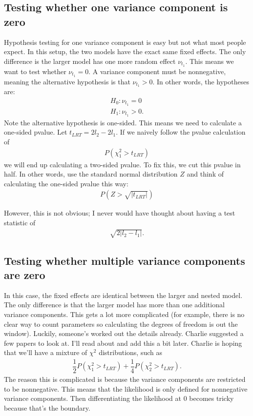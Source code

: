 \documentclass{article}
\begin{document}
 \subsection{Testing whether one variance component is zero}
  Hypothesis testing for one variance component is easy but not what most people expect.
  In this setup, the two models have the exact same fixed effects. The only difference is the larger model has one more random effect $\nu_{t_1}$. This means we want to test whether $\nu_{t_1}=0$. A variance component must be nonnegative, meaning the alternative hypothesis is that $\nu_{t_1}>0$. In other words, the hypotheses are:
 \begin{align}
 H_0: \nu_{t_1}=0\\
 H_1: \nu_{t_1}>0.
 \end{align}
 Note the alternative hypothesis is one-sided. This means we need to calculate a one-sided pvalue. Let $t_{LRT}=2l_2-2l_1$. If we naively follow the pvalue calculation of
 \begin{align}
P( \chi^2_{1}>t_{LRT})
\end{align}
 we will end up calculating a two-sided pvalue. To fix this, we cut this pvalue in half. In other words, use the standard normal distribution $Z$ and think of calculating the one-sided pvalue this way:
 \begin{align}
 P( Z>\sqrt{|  t_{LRT} |})
 \end{align}
 
 However, this is not obvious; I never would have thought about having a test statistic of
 \begin{align}
 \sqrt{2 | l_2-l_1   |   }.
 \end{align}
 
 \subsection{Testing whether multiple variance components are zero}
 In this case, the fixed effects are identical between the larger and nested model. The only difference is that the larger model has more than one additional variance components. This gets a lot more complicated (for example, there is no clear way to count parameters so calculating the degrees of freedom is out the window). Luckily, someone's worked out the details already. Charlie suggested a few papers to look at. I'll read about and add this a bit later.  Charlie is hoping that we'll have a mixture of $\chi^2$ distributions, such as
 \begin{align}
 \dfrac{1}{2}P (\chi^2_1> t_{LRT}) +\dfrac{1}{4}P (\chi^2_2> t_{LRT}).
 \end{align}
 The reason this is complicated is because the variance components are restricted to be nonnegative. This means that the likelihood is only defined for nonnegative variance components. Then differentiating the likelihood at $0$ becomes tricky because that's the boundary.
\end{document}
